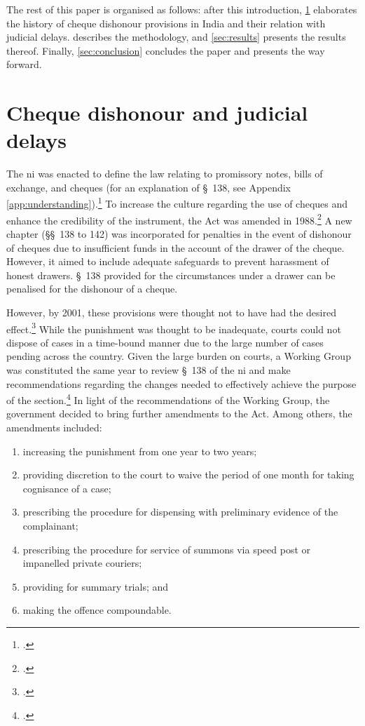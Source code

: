\documentclass[12pt,a4paper]{article}
\begin{document}
The rest of this paper is organised as follows: after this introduction, \cref{sec:history} elaborates the history of cheque dishonour provisions in India and their relation with judicial delays.  describes the methodology, and \cref{sec:results} presents the results thereof. Finally, \cref{sec:conclusion} concludes the paper and presents the way forward.

\section{Cheque dishonour and judicial delays} \label{sec:history}

The \acrlong{ni} was enacted to define the law relating to promissory notes, bills of exchange, and cheques (for an explanation of \S~138, see Appendix \ref{app:understanding}).\footcite{ind1881_niAct} To increase the culture regarding the use of cheques and enhance the credibility of the instrument, the Act was amended in 1988.\footcite{niAmend1988} A new chapter (\S\S~138 to 142) was incorporated for penalties in the event of dishonour of cheques due to insufficient funds in the account of the drawer of the cheque. However, it aimed to include adequate safeguards to prevent harassment of honest drawers. \S~138 provided for the circumstances under a drawer can be penalised for the dishonour of a cheque.

However, by 2001, these provisions were thought not to have had the desired effect.\footcite{stdcomm2001_138niAct} While the punishment was thought to be inadequate, courts could not dispose of cases in a time-bound manner due to the large number of cases pending across the country. Given the large burden on courts, a Working Group was constituted the same year to review \S~138 of the \gls{ni} and make recommendations regarding the changes needed to effectively achieve the purpose of the section.\footcite{wg2001_138} In light of the recommendations of the Working Group, the government decided to bring further amendments to the Act. Among others, the amendments included:

\begin{enumerate}[label=(\alph*)]
 \item increasing the punishment from one year to two years;
 \item providing discretion to the court to waive the period of one month for taking cognisance of a case;
 \item prescribing the procedure for dispensing with preliminary evidence of the complainant;
 \item prescribing the procedure for service of summons via speed post or impanelled private couriers;
 \item providing for summary trials; and
 \item making the offence compoundable.
\end{enumerate}
\end{document}
